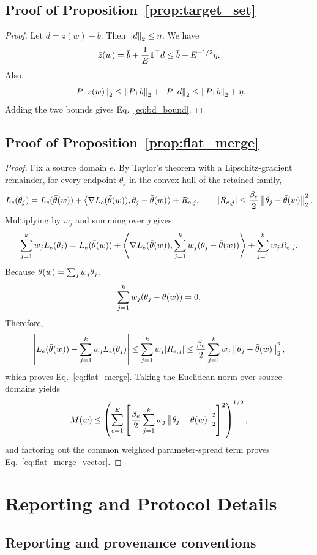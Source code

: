 \subsection{Proof of Proposition~\ref{prop:target_set}}

\begin{proof}
Let \(d=z(w)-b\). Then \(\left\lVert d \right\rVert_2\le \eta\). We have
\[
\bar z(w)
=
\bar b+\frac{1}{E}\mathbf{1}^\top d
\le
\bar b+E^{-1/2}\eta.
\]
Also,
\[
\left\lVert P_\perp z(w) \right\rVert_2
\le
\left\lVert P_\perp b \right\rVert_2+\left\lVert P_\perp d \right\rVert_2
\le
\left\lVert P_\perp b \right\rVert_2+\eta.
\]
Adding the two bounds gives Eq.~\eqref{eq:bd_bound}.
\end{proof}

\subsection{Proof of Proposition~\ref{prop:flat_merge}}

\begin{proof}
Fix a source domain \(e\). By Taylor's theorem with a Lipschitz-gradient remainder, for every endpoint \(\theta_j\) in the convex hull of the retained family,
\[
L_e(\theta_j)
=
L_e(\bar{\theta}(w))
+\left\langle \nabla L_e(\bar{\theta}(w)), \theta_j-\bar{\theta}(w) \right\rangle
+R_{e,j},
\qquad
|R_{e,j}|
\le
\frac{\beta_e}{2}\left\lVert \theta_j-\bar{\theta}(w) \right\rVert_2^2 .
\]
Multiplying by \(w_j\) and summing over \(j\) gives
\[
\sum_{j=1}^k w_j L_e(\theta_j)
=
L_e(\bar{\theta}(w))
+\left\langle \nabla L_e(\bar{\theta}(w)), \sum_{j=1}^k w_j(\theta_j-\bar{\theta}(w)) \right\rangle
+\sum_{j=1}^k w_jR_{e,j}.
\]
Because \(\bar{\theta}(w)=\sum_j w_j\theta_j\),
\[
\sum_{j=1}^k w_j(\theta_j-\bar{\theta}(w))=0.
\]
Therefore,
\[
\left|L_e(\bar{\theta}(w))-\sum_{j=1}^k w_j L_e(\theta_j)\right|
\le
\sum_{j=1}^k w_j |R_{e,j}|
\le
\frac{\beta_e}{2}\sum_{j=1}^k w_j\left\lVert \theta_j-\bar{\theta}(w) \right\rVert_2^2 ,
\]
which proves Eq.~\eqref{eq:flat_merge}. Taking the Euclidean norm over source domains yields
\[
M(w)
\le
\left(
\sum_{e=1}^{E}
\left[
\frac{\beta_e}{2}\sum_{j=1}^k w_j\left\lVert \theta_j-\bar{\theta}(w) \right\rVert_2^2
\right]^2
\right)^{1/2},
\]
and factoring out the common weighted parameter-spread term proves Eq.~\eqref{eq:flat_merge_vector}.
\end{proof}

\section{Reporting and Protocol Details}
\label{app:reporting}

\subsection{Reporting and provenance conventions}

